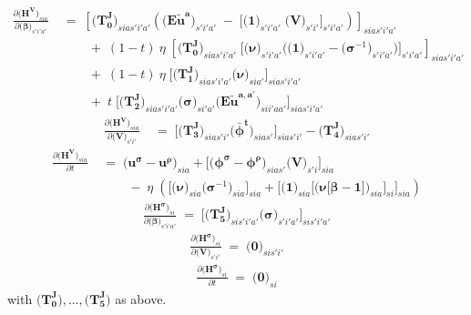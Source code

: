 \documentclass[11pt,fleqn]{article}
\newcommand{\bsigma}{\bm{\sigma}}
\newcommand{\bbeta}{\bm{\beta}}
\newcommand{\bV}{\bm{V}}
\newcommand{\bnu}{\bm{\nu}}
\newcommand{\bzero}{\bm{0}}
\newcommand{\bone}{\bm{1}}
\newcommand{\tu}{\tilde{u}}
\begin{document}
\begin{align*}
	\frac{ \partial \biggl( \bm{H^{V}} \biggr)_{sia} }{ \partial \biggl( \bbeta \biggr)_{s'i'a'} } & \;=\; 
		\left[ \biggl( \bm{T_0^J} \biggr)_{sias'i'a'} \left( \biggl( \bm{{E\tu^{a}}} \biggr)_{s'i'a'} \;-\; \Biggl[ \biggl( \bone \biggr)_{s'i'a'} \; \biggl( \bV \biggr)_{s'i'} \Biggr]_{s'i'a'} \right) \right]_{sias'i'a'} \\
		& \qquad \;+\; (1-t) \: \eta \; \left[ \biggl( \bm{T_0^J} \biggr)_{sias'i'a'} \; \Biggl[ \biggl( \bnu \biggr)_{s'i'a'} \Biggl( \biggl( \bone \biggr)_{s'i'a'} - \biggl( \bsigma^{-1} \biggr)_{s'i'a'} \Biggr) \Biggr]_{s'i'a'} \right]_{sias'i'a'} \\
		& \qquad \;+\;  (1-t) \: \eta \; \Biggl[ \biggl( \bm{T_1^J} \biggr)_{sias'i'a'} \biggl( \bnu \biggr)_{sia'} \Biggr]_{sias'i'a'} \\
		& \qquad \;+\; t \; \Biggl[ \biggl( \bm{T_2^J} \biggr)_{sias'i'a'} \biggl( \bsigma \biggr)_{si'a'} \biggl( \bm{{E\tu^{a,a'}}} \biggr)_{sii'aa'} \Biggr]_{sias'i'a'}
\end{align*}
\begin{align*}
	\frac{ \partial \biggl( \bm{H^{V}} \biggr)_{sia} }{ \partial \biggl( \bV \biggr)_{s'i'} } & \;=\; 
		\Biggl[ \biggl( \bm{T_3^J} \biggr)_{sias'i'} \biggl( \bm{{\bar{\phi}^t}} \biggr)_{sias'} \Biggr]_{sias'i'} - \biggl( \bm{T_4^J} \biggr)_{sias'i'}
\end{align*}
\begin{align*}
	\frac{ \partial \biggl( \bm{H^{V}} \biggr)_{sia} }{ \partial t } & \;=\; 
		\biggl( \bm{u^{\sigma}} - \bm{u^{\rho}} \biggr)_{sia} + \Biggl[ \biggl( \bm{\phi^{\sigma}} - \bm{\phi^{\rho}} \biggr)_{sias'} \biggl( \bV \biggr)_{s'i} \Biggr]_{sia} \\
		& \qquad \;-\; \eta \; \left( \Biggl[ \biggl( \bnu \biggr)_{sia} \biggl( \bsigma^{-1} \biggr)_{sia} \Biggr]_{sia} + \Biggl[ \biggl( \bone \biggr)_{sia} \Biggl[ \biggl( \bnu\bigl[\bbeta-\bone\bigr] \biggr)_{sia} \Biggr]_{si} \Biggr]_{sia} \right)
\end{align*}
\begin{align*}
	\frac{ \partial \biggl( \bm{H^{\sigma}} \biggr)_{si} }{ \partial \biggl( \bbeta \biggr)_{s'i'a'} } \;=\; 
	\Biggl[ \biggl( \bm{T_5^J} \biggr)_{sis'i'a'} \biggl( \bsigma \biggr)_{s'i'a'} \Biggr]_{sis'i'a'}
\end{align*}
\begin{align*}
	\frac{ \partial \biggl( \bm{H^{\sigma}} \biggr)_{si} }{ \partial \biggl( \bV \biggr)_{s'i'} } \;=\; \biggl( \bzero \biggr)_{sis'i'}
\end{align*}
\begin{align*}
	\frac{ \partial \biggl( \bm{H^{\sigma}} \biggr)_{si} }{ \partial t } \;=\; \biggl( \bzero \biggr)_{si}
\end{align*}
with $\biggl(\bm{T_0^J}\biggr), \dots, \biggl(\bm{T_5^J}\biggr)$ as above.
\end{document}
